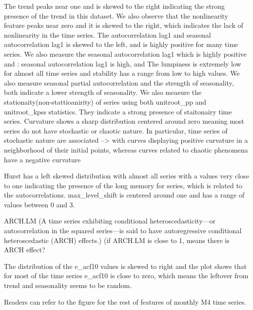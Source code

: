 \documentclass[]{elsarticle} %
\begin{document}
The trend peaks near one and is skewed to the right indicating the
strong presence of the trend in this dataset. We also observe that the
nonlinearity feature peaks near zero and it is skewed to the right,
which indicates the lack of nonlinearity in the time series. The
autocorrelation lag1 and seasonal autocorrelation lag1 is skewed to the
left, and is highly positive for many time series. We also measure the
seasonal autocorrelation lag1 which is highly positive and : seasonal
autocorrelation lag1 is high, and The lumpiness is extremely low for
almost all time series and stability has a range from low to high
values. We also measure seasonal partial autocorrelation and the
strength of seasonality, both indicate a lower strength of seasonality.
We also measure the stationaity(non-stattioanirity) of series using both
unitroot\_pp and unitroot\_kpss statistics. They indicate a strong
presence of staitonairy time series. Curvature shows a sharp
distribution centered around zero meaning most series do not have
stochastic or chaotic nature. In particular, time series of stochastic
nature are associated --\textgreater{} with curves displaying positive
curvature in a neighborhood of their initial points, whereas curves
related to chaotic phenomena have a negative curvature

Hurst has a left skewed distribution with almost all series with a
values very close to one indicating the presence of the long memory for
series, which is related to the autocorrelations. max\_level\_shift is
centered around one and has a range of values between 0 and 3.

ARCH.LM (A time series exhibiting conditional heteroscedasticity---or
autocorrelation in the squared series---is said to have autoregressive
conditional heteroscedastic (ARCH) effects.) (if ARCH.LM is close to 1,
means there is ARCH effect?

The distribution of the e\_acf10 values is skewed to right and the plot
shows that for most of the time series e\_acf10 is close to zero, which
means the leftover from trend and seasonality seems to be random.

Readers can refer to the figure for the rest of features of monthly M4
time series.
\end{document}
